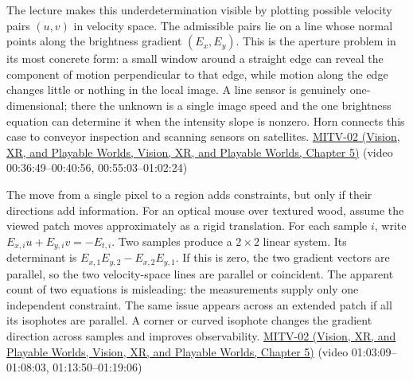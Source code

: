 The lecture makes this underdetermination visible by plotting possible velocity pairs \((u,v)\) in velocity space. The admissible pairs lie on a line whose normal points along the brightness gradient \((E_x,E_y)\). This is the aperture problem in its most concrete form: a small window around a straight edge can reveal the component of motion perpendicular to that edge, while motion along the edge changes little or nothing in the local image. A line sensor is genuinely one-dimensional; there the unknown is a single image speed and the one brightness equation can determine it when the intensity slope is nonzero. Horn connects this case to conveyor inspection and scanning sensors on satellites. \href{../07-Vision-XR-and-Playable-Worlds/main.pdf\#nameddest=04-visual-computing-ii-ch036-mitv-02---image-formation-perspective-projection-time-derivative-motion-field}{MITV-02 (Vision, XR, and Playable Worlds, Vision, XR, and Playable Worlds, Chapter 5)} (video 00:36:49--00:40:56, 00:55:03--01:02:24)

The move from a single pixel to a region adds constraints, but only if their directions add information. For an optical mouse over textured wood, assume the viewed patch moves approximately as a rigid translation. For each sample \(i\), write \(E_{x,i}u+E_{y,i}v=-E_{t,i}\). Two samples produce a \(2\times2\) linear system. Its determinant is \(E_{x,1}E_{y,2}-E_{x,2}E_{y,1}\). If this is zero, the two gradient vectors are parallel, so the two velocity-space lines are parallel or coincident. The apparent count of two equations is misleading: the measurements supply only one independent constraint. The same issue appears across an extended patch if all its isophotes are parallel. A corner or curved isophote changes the gradient direction across samples and improves observability. \href{../07-Vision-XR-and-Playable-Worlds/main.pdf\#nameddest=04-visual-computing-ii-ch036-mitv-02---image-formation-perspective-projection-time-derivative-motion-field}{MITV-02 (Vision, XR, and Playable Worlds, Vision, XR, and Playable Worlds, Chapter 5)} (video 01:03:09--01:08:03, 01:13:50--01:19:06)

